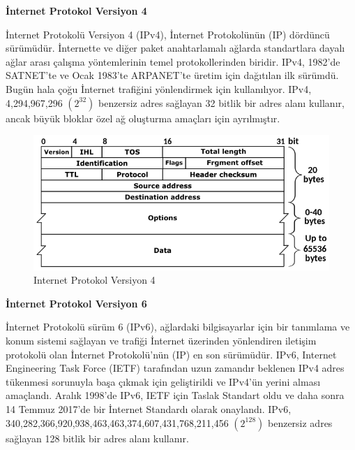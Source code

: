 \vspace{10mm}
\textbf{İnternet Protokol Versiyon 4}
\vspace{5mm}

İnternet Protokolü Versiyon 4 (IPv4), İnternet Protokolünün (IP) dördüncü sürümüdür. İnternette ve diğer paket anahtarlamalı ağlarda standartlara dayalı ağlar arası çalışma yöntemlerinin temel protokollerinden biridir. IPv4, 1982'de SATNET'te ve Ocak 1983'te ARPANET'te üretim için dağıtılan ilk sürümdü. Bugün hala çoğu İnternet trafiğini yönlendirmek için kullanılıyor.
IPv4, 4,294,967,296 $(2^{32})$ benzersiz adres sağlayan 32 bitlik bir adres alanı kullanır, ancak büyük bloklar özel ağ oluşturma amaçları için ayrılmıştır.

\begin{figure}[!htb]
    \centering
    \includegraphics[width=1\linewidth]{00-images/10-internet_protocol_v4.png}
    \caption{Internet Protokol Versiyon 4}
    \label{fig:my_label}
\end{figure}

\vspace{10mm}
\textbf{İnternet Protokol Versiyon 6}
\vspace{5mm}

İnternet Protokolü sürüm 6 (IPv6), ağlardaki bilgisayarlar için bir tanımlama ve konum sistemi sağlayan ve trafiği İnternet üzerinden yönlendiren iletişim protokolü olan İnternet Protokolü'nün (IP) en son sürümüdür. IPv6, Internet Engineering Task Force (IETF) tarafından uzun zamandır beklenen IPv4 adres tükenmesi sorunuyla başa çıkmak için geliştirildi ve IPv4'ün yerini alması amaçlandı. Aralık 1998'de IPv6, IETF için Taslak Standart oldu ve daha sonra 14 Temmuz 2017'de bir İnternet Standardı olarak onaylandı. IPv6, 340,282,366,920,938,463,463,374,607,431,768,211,456 $(2^{128})$ benzersiz adres sağlayan 128 bitlik bir adres alanı kullanır.

